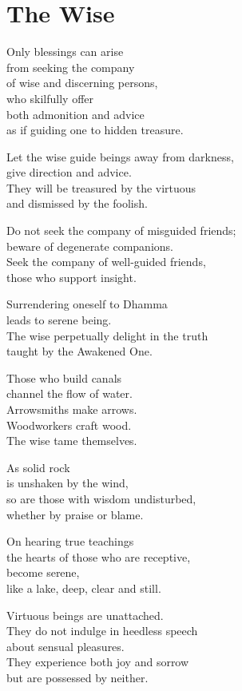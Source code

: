 
\chapter{The Wise}


Only blessings can arise\\
from seeking the company\\
of wise and discerning persons,\\
who skilfully offer\\
both admonition and advice\\
as if guiding one to hidden treasure.


Let the wise guide beings away from darkness,\\
give direction and advice.\\
They will be treasured by the virtuous\\
and dismissed by the foolish.


Do not seek the company of misguided friends;\\
beware of degenerate companions.\\
Seek the company of well-guided friends,\\
those who support insight.


Surrendering oneself to Dhamma\\
leads to serene being.\\
The wise perpetually delight in the truth\\
taught by the Awakened One.


Those who build canals\\
channel the flow of water.\\
Arrowsmiths make arrows.\\
Woodworkers craft wood.\\
The wise tame themselves.


As solid rock\\
is unshaken by the wind,\\
so are those with wisdom undisturbed,\\
whether by praise or blame.


On hearing true teachings\\
the hearts of those who are receptive,\\
become serene,\\
like a lake, deep, clear and still.


Virtuous beings are unattached.\\
They do not indulge in heedless speech\\
about sensual pleasures.\\
They experience both joy and sorrow\\
but are possessed by neither.


